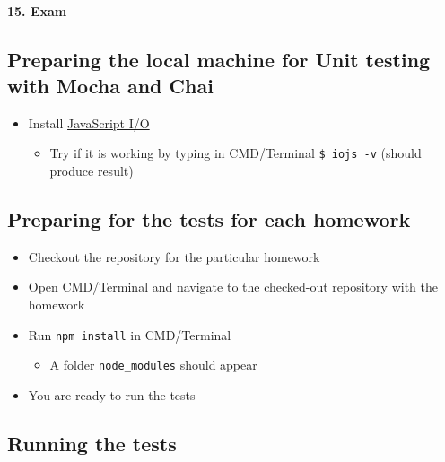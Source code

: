 \paragraph{15. Exam}\label{exam}

\subsection{Preparing the local machine for Unit testing with Mocha and
Chai}\label{preparing-the-local-machine-for-unit-testing-with-mocha-and-chai}

\begin{itemize}
\tightlist
\item
  Install \href{https://iojs.org/en/index.html}{JavaScript I/O}

  \begin{itemize}
  \tightlist
  \item
    Try if it is working by typing in CMD/Terminal \texttt{\$\ iojs\ -v}
    (should produce result)
  \end{itemize}
\end{itemize}

\subsection{Preparing for the tests for each
homework}\label{preparing-for-the-tests-for-each-homework}

\begin{itemize}
\tightlist
\item
  Checkout the repository for the particular homework
\item
  Open CMD/Terminal and navigate to the checked-out repository with the
  homework
\item
  Run \texttt{npm\ install} in CMD/Terminal

  \begin{itemize}
  \tightlist
  \item
    A folder \texttt{node\_modules} should appear
  \end{itemize}
\item
  You are ready to run the tests
\end{itemize}

\subsection{Running the tests}\label{running-the-tests}

